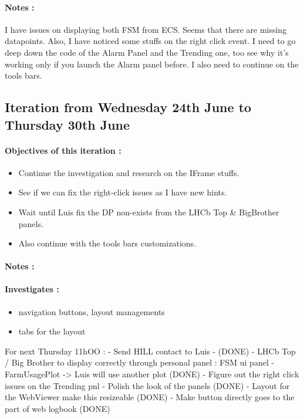 \documentclass[a4paper, 12pt]{article}
\begin{document}
\begin{appendix}
    \paragraph{Notes :}
    I have issues on displaying both FSM from ECS. Seems that there are missing datapoints. Also, I have noticed some stuffs on the right click event.
    I need to go deep down the code of the Alarm Panel and the Trending one, too see why it's working only if you launch the Alarm panel before.
    I also need to continue on the tools bars.
    \subsection{Iteration from Wednesday 24th June to Thursday 30th June}
    \paragraph{Objectives of this iteration :}
    \begin{itemize}
        \item Continue the investigation and research on the IFrame stuffs.
        \item See if we can fix the right-click issues as I have new hints.
        \item Wait until Luis fix the DP non-exists from the LHCb Top \& BigBrother panels.
        \item Also continue with the tools bars customizations.
    \end{itemize}
    \paragraph{Notes :}
    \paragraph{Investigates :}
    \begin{itemize}
        \item navigation buttons, layout managements
        \item tabs for the layout
    \end{itemize}
    
    For next Thursday 11hOO : 
    - Send HILL contact to Luis - (DONE)
    - LHCb Top / Big Brother to display correctly through personal panel : FSM ui panel
    - FarmUsagePlot -> Luis will use another plot (DONE)
    - Figure out the right click issues on the Trending pnl
    - Polish the look of the panels (DONE)
    - Layout for the WebViewer make this resizeable (DONE)
    - Make button directly goes to the part of web logbook (DONE)


\end{appendix}
\end{document}
